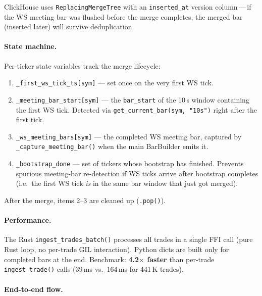 \documentclass[a4paper, 11pt]{article}
\begin{document}
\noindent ClickHouse uses \texttt{ReplacingMergeTree} with an \texttt{inserted\_at} version
column\,---\,if the WS meeting bar was flushed before the merge completes, the merged
bar (inserted later) will survive deduplication.

\paragraph{State machine.}
Per-ticker state variables track the merge lifecycle:

\begin{enumerate}[nosep]
    \item \texttt{\_first\_ws\_tick\_ts[sym]} --- set once on the very first WS tick.
    \item \texttt{\_meeting\_bar\_start[sym]} --- the \texttt{bar\_start} of the 10\,s
          window containing the first WS tick.  Detected via
          \texttt{get\_current\_bar(sym, "10s")} right after the first tick.
    \item \texttt{\_ws\_meeting\_bars[sym]} --- the completed WS meeting bar, captured
          by \texttt{\_capture\_meeting\_bar()} when the main BarBuilder emits it.
    \item \texttt{\_bootstrap\_done} --- set of tickers whose bootstrap has finished.
          Prevents spurious meeting-bar re-detection if WS ticks arrive after
          bootstrap completes (i.e.\ the first WS tick \emph{is} in the same
          bar window that just got merged).
\end{enumerate}

After the merge, items 2--3 are cleaned up (\texttt{.pop()}).

\paragraph{Performance.}
The Rust \texttt{ingest\_trades\_batch()} processes all trades in a single FFI call
(pure Rust loop, no per-trade GIL interaction).  Python dicts are built only for
completed bars at the end.  Benchmark: \textbf{4.2$\times$ faster} than per-trade
\texttt{ingest\_trade()} calls (39\,ms vs.\ 164\,ms for 441\,K trades).

\pagebreak

\paragraph{End-to-end flow.}
\end{document}
